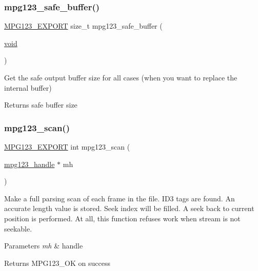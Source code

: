 \subsubsection{\texorpdfstring{mpg123\_safe\_buffer()}{mpg123\_safe\_buffer()}}
{\footnotesize\ttfamily \mbox{\hyperlink{mpg123_8h_a2ba98cfba3f760879df70e755b2a61cc}{M\+P\+G123\+\_\+\+E\+X\+P\+O\+RT}} size\+\_\+t mpg123\+\_\+safe\+\_\+buffer (\begin{DoxyParamCaption}\item[{\mbox{\hyperlink{_s_d_l__opengles2__gl2ext_8h_ae5d8fa23ad07c48bb609509eae494c95}{void}}}]{ }\end{DoxyParamCaption})}

Get the safe output buffer size for all cases (when you want to replace the internal buffer) \begin{DoxyReturn}{Returns}
safe buffer size 
\end{DoxyReturn}
\mbox{\label{group__mpg123__status_ga229cf48b0e7020403e423824f6b9ac2c}} 
\subsubsection{\texorpdfstring{mpg123\_scan()}{mpg123\_scan()}}
{\footnotesize\ttfamily \mbox{\hyperlink{mpg123_8h_a2ba98cfba3f760879df70e755b2a61cc}{M\+P\+G123\+\_\+\+E\+X\+P\+O\+RT}} int mpg123\+\_\+scan (\begin{DoxyParamCaption}\item[{\mbox{\hyperlink{group__mpg123__init_ga6728e2839a395f3a07d4514da659faca}{mpg123\+\_\+handle}} $\ast$}]{mh }\end{DoxyParamCaption})}

Make a full parsing scan of each frame in the file. I\+D3 tags are found. An accurate length value is stored. Seek index will be filled. A seek back to current position is performed. At all, this function refuses work when stream is not seekable. 
\begin{DoxyParams}{Parameters}
{\em mh} & handle \\
\hline
\end{DoxyParams}
\begin{DoxyReturn}{Returns}
M\+P\+G123\+\_\+\+OK on success 
\end{DoxyReturn}
\mbox{\label{group__mpg123__status_gad0301e80dbc3f48e47e27d39cd328755}} 
